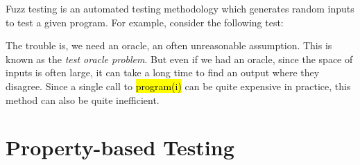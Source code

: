 \documentclass[12pt,initial,twoside,maitrise]{dms}
\newcommand{\inline}[1]{%
    \begingroup%
    \sethlcolor{slightgray}%
    \hl{\ttfamily\footnotesize #1}%
    \endgroup
}
\numberwithin{equation}{section}
\numberwithin{table}{chapter}
\numberwithin{figure}{chapter}
\begin{document}
Fuzz testing is an automated testing methodology which generates random inputs to test a given program. For example, consider the following test:
%
%
The trouble is, we need an oracle, an often unreasonable assumption. This is known as the \textit{test oracle problem}. But even if we had an oracle, since the space of inputs is often large, it can take a long time to find an output where they disagree. Since a single call to \inline{program(i)} can be quite expensive in practice, this method can also be quite inefficient.

\section{Property-based Testing}\label{subsec:property-based-testing}
\end{document}
